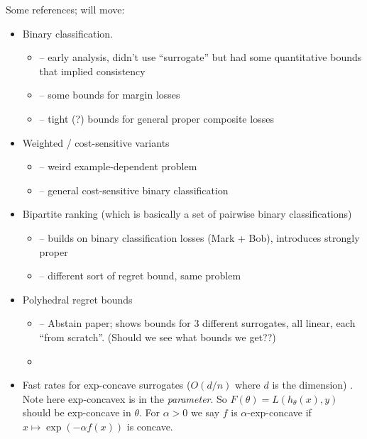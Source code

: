 \documentclass{article}
\theoremstyle{definition}\newtheorem{definition}{Definition}
\theoremstyle{definition}\newtheorem{assumption}{Assumption}
\begin{document}
Some references; will move:
\begin{itemize}
\item Binary classification.
  \begin{itemize}
  \item \citet{zhang2004statistical} -- early analysis, didn't use ``surrogate'' but had some quantitative bounds that implied consistency
  \item \citet{bartlett2006convexity} -- some bounds for margin losses
  \item \citet{reid2009surrogate} -- tight (?) bounds for general proper composite losses
  \end{itemize}

  
\item Weighted / cost-sensitive variants
  \begin{itemize}
  \item \citet{scott2011surrogate} -- weird example-dependent problem
  \item \citet{scott2012calibrated} -- general cost-sensitive binary classification
  \end{itemize}
  
\item Bipartite ranking (which is basically a set of pairwise binary classifications)
  \begin{itemize}
  \item \citet{agarwal2014surrogate} -- builds on binary classification losses (Mark + Bob), introduces strongly proper
  \item \citet{menon2016bipartite} -- different sort of regret bound, same problem
  \end{itemize}
  
\item Polyhedral regret bounds
  \begin{itemize}
  \item \citet{ramaswamy2018consistent} -- Abstain paper; shows bounds for 3 different surrogates, all linear, each ``from scratch''.  (Should we see what bounds we get??)
  \item 
  \end{itemize}
  
\item Fast rates for exp-concave surrogates ($O(d/n)$ where $d$ is the dimension) \citep{koren2015fast}.  Note here exp-concavex is in the \emph{parameter}.  So $F(\theta) = L(h_\theta(x),y)$ should be exp-concave in $\theta$.  For $\alpha>0$ we say $f$ is $\alpha$-exp-concave if $x \mapsto \exp(-\alpha f(x))$ is concave.
\end{itemize}
\end{document}

